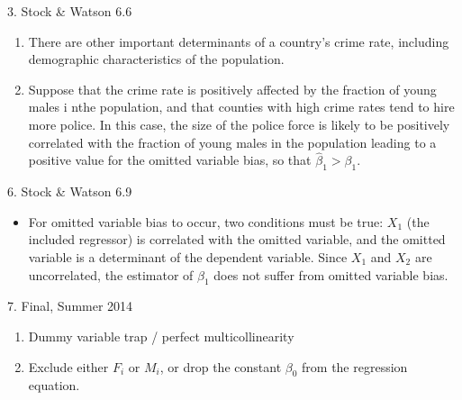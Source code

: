 \documentclass[12pt]{article}
\begin{document}
3. Stock \& Watson 6.6
\begin{enumerate}
  \item There are other important determinants of a country's crime rate, including demographic characteristics of the population.
  
  \item Suppose that the crime rate is positively affected by the fraction of young males i nthe population, and that counties with high crime rates tend to hire more police.
  In this case, the size of the police force is likely to be positively correlated with the fraction of young males in the population leading to a positive value for the omitted variable bias, so that $\hat\beta_1>\beta_1$.
\end{enumerate}


6. Stock \& Watson 6.9
\begin{itemize}
  \item For omitted variable bias to occur, two conditions must be true: $X_1$ (the included regressor) is correlated with the omitted variable, and the omitted variable is a determinant of the dependent variable.
  Since $X_1$ and $X_2$ are uncorrelated, the estimator of $\beta_1$ does not suffer from omitted variable bias.
\end{itemize}


7. Final, Summer 2014
\begin{enumerate}
  \item Dummy variable trap / perfect multicollinearity
  \item Exclude either $F_i$ or $M_i$, or drop the constant $\beta_0$ from the regression equation.
\end{enumerate}
\end{document}
